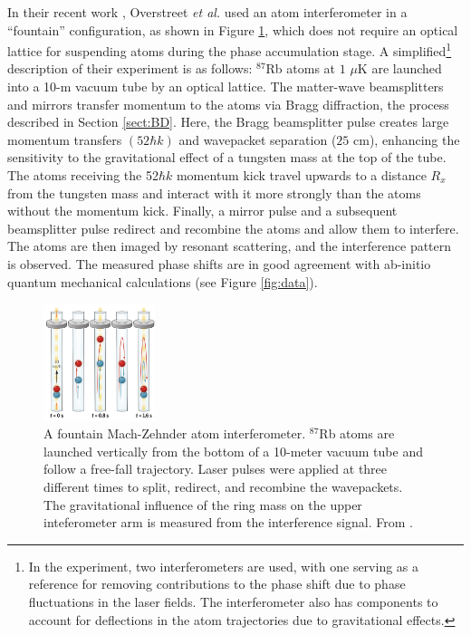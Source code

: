 \documentclass[reprint,
nofootinbib,
amsmath,amssymb,
aps]{revtex4-1}
\begin{document}
In their recent work \cite{overstreet2022observation}, Overstreet \textit{et al.} used an atom interferometer in a ``fountain'' configuration, as shown in Figure \ref{fig:overstreet1}, which does not require an optical lattice for suspending atoms during the phase accumulation stage.  A simplified\footnote{In the experiment, two interferometers are used, with one serving as a reference for removing contributions to the phase shift due to phase fluctuations in the laser fields. The interferometer also has components to account for deflections in the atom trajectories due to gravitational effects.} description of their experiment is as follows: $^{87}$Rb atoms at $1$ $\mu$K are launched into a 10-m vacuum tube by an optical lattice. The matter-wave beamsplitters and mirrors transfer momentum to the atoms via Bragg diffraction, the process described in Section \ref{sect:BD}.  Here, the Bragg beamsplitter pulse creates large momentum transfers $(52\hbar k)$ and wavepacket separation ($25$ cm), enhancing the sensitivity to the gravitational effect of a tungsten mass at the top of the tube. The atoms receiving the 52$\hbar k$ momentum kick travel upwards to a distance $R_x$ from the tungsten mass and interact with it more strongly than the atoms without the momentum kick. Finally, a mirror pulse and a subsequent beamsplitter pulse redirect and recombine the atoms and allow them to interfere. The atoms are then imaged by resonant scattering, and the interference pattern is observed. The measured phase shifts are in good agreement with ab-initio quantum mechanical calculations (see Figure \ref{fig:data}). 






\begin{figure}
	\includegraphics[width=0.29\textwidth]{overstreet1.png}
	\caption{A fountain Mach-Zehnder atom interferometer. $^{87}$Rb atoms are launched vertically from the bottom of a 10-meter vacuum tube and follow a free-fall trajectory. Laser pulses were applied at three different times to split, redirect, and recombine the wavepackets. The gravitational influence of the ring mass on the upper inteferometer arm is measured from the interference signal. From \cite{roura2022quantum}.}
	\label{fig:overstreet1}
\end{figure}
\end{document}
